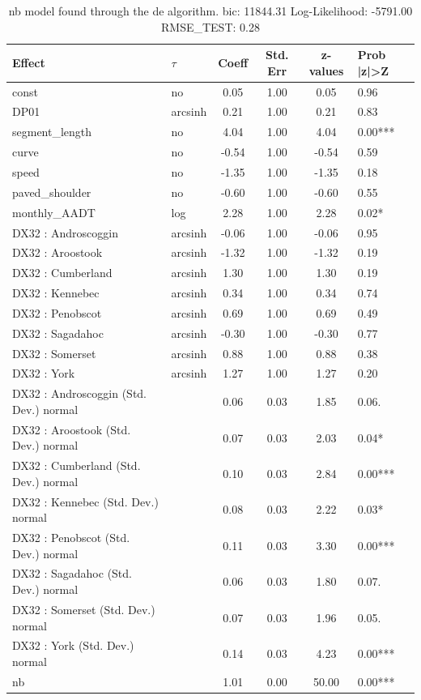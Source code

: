 \begin{table}
	\caption{nb model found through the de algorithm. bic: 11844.31 Log-Likelihood: -5791.00 RMSE_TEST: 0.28}
	\begin{center}
		\begin{tabular}{|l|l|c|c|c|l|}
			\hline
			Effect & $\tau$ & Coeff & Std. Err & z-values & Prob |z|>Z \\
			\hline
			const & no & 0.05 & 1.00 & 0.05 & 0.96 \\
			\hline
			DP01 & arcsinh & 0.21 & 1.00 & 0.21 & 0.83 \\
			\hline
			segment_length & no & 4.04 & 1.00 & 4.04 & 0.00*** \\
			\hline
			curve & no & -0.54 & 1.00 & -0.54 & 0.59 \\
			\hline
			speed & no & -1.35 & 1.00 & -1.35 & 0.18 \\
			\hline
			paved_shoulder & no & -0.60 & 1.00 & -0.60 & 0.55 \\
			\hline
			monthly_AADT & log & 2.28 & 1.00 & 2.28 & 0.02* \\
			\hline
			DX32 : Androscoggin & arcsinh & -0.06 & 1.00 & -0.06 & 0.95 \\
			\hline
			DX32 : Aroostook & arcsinh & -1.32 & 1.00 & -1.32 & 0.19 \\
			\hline
			DX32 : Cumberland & arcsinh & 1.30 & 1.00 & 1.30 & 0.19 \\
			\hline
			DX32 : Kennebec & arcsinh & 0.34 & 1.00 & 0.34 & 0.74 \\
			\hline
			DX32 : Penobscot & arcsinh & 0.69 & 1.00 & 0.69 & 0.49 \\
			\hline
			DX32 : Sagadahoc & arcsinh & -0.30 & 1.00 & -0.30 & 0.77 \\
			\hline
			DX32 : Somerset & arcsinh & 0.88 & 1.00 & 0.88 & 0.38 \\
			\hline
			DX32 : York & arcsinh & 1.27 & 1.00 & 1.27 & 0.20 \\
			\hline
			DX32 : Androscoggin (Std. Dev.) normal &  & 0.06 & 0.03 & 1.85 & 0.06. \\
			\hline
			DX32 : Aroostook (Std. Dev.) normal &  & 0.07 & 0.03 & 2.03 & 0.04* \\
			\hline
			DX32 : Cumberland (Std. Dev.) normal &  & 0.10 & 0.03 & 2.84 & 0.00*** \\
			\hline
			DX32 : Kennebec (Std. Dev.) normal &  & 0.08 & 0.03 & 2.22 & 0.03* \\
			\hline
			DX32 : Penobscot (Std. Dev.) normal &  & 0.11 & 0.03 & 3.30 & 0.00*** \\
			\hline
			DX32 : Sagadahoc (Std. Dev.) normal &  & 0.06 & 0.03 & 1.80 & 0.07. \\
			\hline
			DX32 : Somerset (Std. Dev.) normal &  & 0.07 & 0.03 & 1.96 & 0.05. \\
			\hline
			DX32 : York (Std. Dev.) normal &  & 0.14 & 0.03 & 4.23 & 0.00*** \\
			\hline
			nb &  & 1.01 & 0.00 & 50.00 & 0.00*** \\
			\hline
		\end{tabular}
	\end{center}
\end{table}
